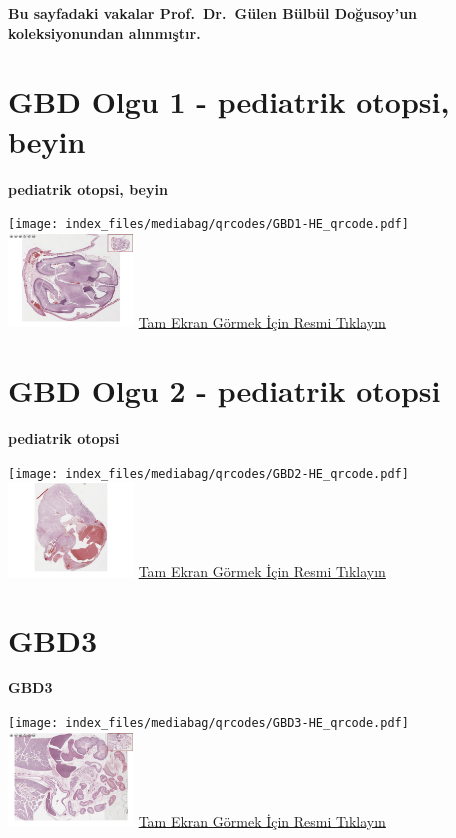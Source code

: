 \documentclass[
  letterpaper,
  DIV=11,
  numbers=noendperiod]{scrreprt}
\begin{document}
\textbf{Bu sayfadaki vakalar Prof.~Dr.~Gülen Bülbül Doğusoy'un
koleksiyonundan alınmıştır.}

\hypertarget{sec-GBD1}{%
\section{GBD Olgu 1 - pediatrik otopsi, beyin}\label{sec-GBD1}}

\textbf{pediatrik otopsi, beyin}

\texttt{[image: index\_files/mediabag/qrcodes/GBD1-HE\_qrcode.pdf]}
\href{https://images.patolojiatlasi.com/GBD1/HE.html}{\includegraphics[width=0.25\textwidth,height=\textheight]{./screenshots/thumbnail_GBD1.png}}
\href{https://images.patolojiatlasi.com/GBD1/HE.html}{Tam Ekran Görmek
İçin Resmi Tıklayın}

\hypertarget{sec-GBD2}{%
\section{GBD Olgu 2 - pediatrik otopsi}\label{sec-GBD2}}

\textbf{pediatrik otopsi}

\texttt{[image: index\_files/mediabag/qrcodes/GBD2-HE\_qrcode.pdf]}
\href{https://images.patolojiatlasi.com/GBD2/HE.html}{\includegraphics[width=0.25\textwidth,height=\textheight]{./screenshots/thumbnail_GBD2.png}}
\href{https://images.patolojiatlasi.com/GBD2/HE.html}{Tam Ekran Görmek
İçin Resmi Tıklayın}

\hypertarget{sec-GBD3}{%
\section{GBD3}\label{sec-GBD3}}

\textbf{GBD3}

\texttt{[image: index\_files/mediabag/qrcodes/GBD3-HE\_qrcode.pdf]}
\href{https://images.patolojiatlasi.com/GBD3/HE.html}{\includegraphics[width=0.25\textwidth,height=\textheight]{./screenshots/thumbnail_GBD3.png}}
\href{https://images.patolojiatlasi.com/GBD3/HE.html}{Tam Ekran Görmek
İçin Resmi Tıklayın}
\end{document}

